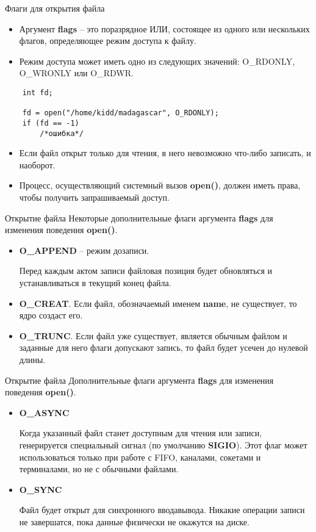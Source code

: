 \documentclass[xcolor=table]{beamer}
\begin{document}
\begin{frame}[fragile]{Флаги для открытия файла}
	\begin{itemize}
		\item Аргумент \textbf{flags} -- это поразрядное ИЛИ, состоящее из одного или нескольких флагов, определяющее режим доступа к файлу. 
		\item Режим доступа может иметь одно из следующих значений: O\_RDONLY, O\_WRONLY или O\_RDWR.
	\end{itemize}
	\begin{verbatim}
	int fd;

	fd = open("/home/kidd/madagascar", O_RDONLY);
	if (fd == -1)
		/*ошибка*/
	\end{verbatim}  
	\begin{itemize}
		\item Если файл открыт только для чтения, в него невозможно что­-либо записать, и наоборот. 
		\item Процесс, осуществляющий системный вызов \textbf{open()}, должен иметь права, чтобы получить запрашиваемый доступ. 
	\end{itemize}
\end{frame}

\begin{frame}{Открытие файла}
	Некоторые дополнительные флаги аргумента \textbf{flags} для изменения поведения \textbf{open()}. 
	\begin{itemize}
		\item \textbf{O\_APPEND} -- режим дозаписи.
		
		\medskip Перед каждым актом записи файловая позиция будет обновляться и устанавливаться в текущий конец файла.
		\item \textbf{O\_CREAT}. Если файл, обозначаемый именем \textbf{name}, не существует, то ядро создаст его. 
		\item \textbf{O\_TRUNC}. Если файл уже существует, является обычным файлом и заданные для него флаги допускают запись, то файл будет усечен до нулевой длины. 
	\end{itemize}
\end{frame}

\begin{frame}{Открытие файла}
	Дополнительные флаги аргумента \textbf{flags} для изменения поведения \textbf{open()}. 
	\begin{itemize}
	\item \textbf{O\_ASYNC}
	
	\medskip Когда указанный файл станет доступным для чтения или записи, генерируется специальный сигнал (по умолчанию \textbf{SIGIO}). Этот флаг может 	использоваться только при работе с FIFO, каналами, сокетами и терминалами, но не с обычными файлами.
	\item \textbf{O\_SYNC}
	
	\medskip Файл будет открыт для синхронного ввода­вывода. Никакие операции записи не завершатся, пока данные физически не окажутся на диске. 
\end{itemize}
\end{frame}
\end{document}
